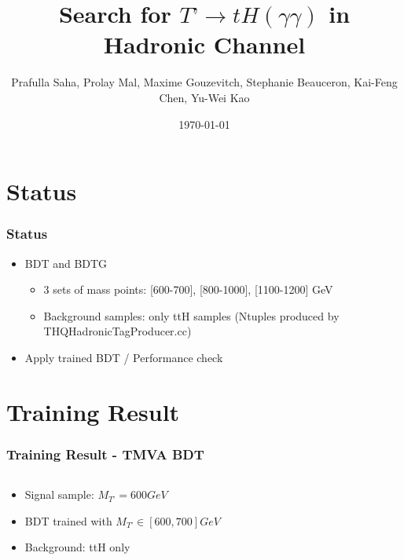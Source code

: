 \documentclass{beamer}
\title{Search for $T’ \to tH(\gamma\gamma)$ in Hadronic Channel}
\author{Prafulla Saha, Prolay Mal, Maxime Gouzevitch, Stephanie Beauceron, Kai-Feng Chen, Yu-Wei Kao}
\institute{National Taiwan University}
\date{\today}
\begin{document}
\frame{\titlepage}
\section{Status}
\begin{frame}
\frametitle{Status}
\begin{itemize}
\item BDT and BDTG
    \begin{itemize}
    \item 3 sets of mass points: [600-700], [800-1000], [1100-1200] GeV
    \item Background samples: only ttH samples (Ntuples produced by THQHadronicTagProducer.cc)
    \end{itemize}
\item Apply trained BDT / Performance check
\end{itemize}
\end{frame}

\section{Training Result}
\begin{frame}
\frametitle{Training Result - TMVA BDT}

\begin{columns}
\begin{column}{0.5\textwidth}
    \begin{scriptsize}
    \begin{itemize}
    \item Signal sample: $M_{T’} = 600 GeV$
    \item BDT trained with $M_{T’} \in [600, 700] GeV$
    \item Background: ttH only
    \end{itemize}
    \end{scriptsize}

    \begin{figure}
        \centering
        \label{fig:mva_bdt}
    \end{figure}
\end{column}
\begin{column}{0.5\textwidth}
    \begin{figure}
        \centering
        \qquad
        \label{fig:mva_bdt}
    \end{figure}
\end{column}
\end{columns}

\end{frame}
\end{document}
